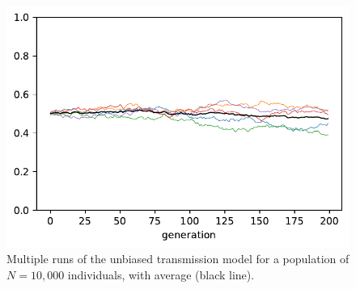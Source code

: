 \documentclass[
  a4paperpaper,
  ,captions=tableheading
]{scrbook}
\begin{document}
\begin{figure}[H]

{\centering \includegraphics{chapter03_files/figure-pdf/cell-27-output-1.pdf}

}

\caption{Multiple runs of the unbiased transmission model for a
population of \(N=10,000\) individuals, with average (black line).}

\end{figure}
\end{document}
